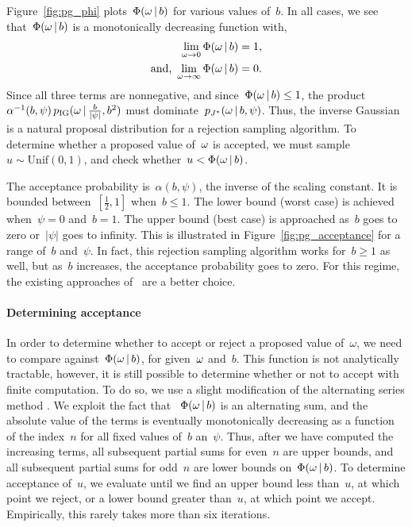 Figure~\ref{fig:pg_phi} plots~$\Phi({\omega} \,|\, b)$ for various values of~$b$.
In all cases, we see that~$\Phi({\omega} \,|\, b)$ is a monotonically
decreasing function with,
\begin{align*}
  \lim_{\omega \to 0} \Phi(\omega \,|\, b) &= 1, \\
  \text{and, }
  \lim_{\omega \to \infty} \Phi(\omega \,|\, b) &= 0.
\end{align*}
Since all three terms are nonnegative, and since~${\Phi({\omega} \,|\,
  b) \leq 1}$, the product~${\alpha^{-1}(b,\psi)\,
  p_{\mathrm{IG}}({\omega} \,|\, \tfrac{b}{|\psi|}, b^2)}$
must dominate~$p_{J^{*}}({\omega} \,|\, b,\psi)$.  Thus, the inverse
Gaussian is a natural proposal distribution for a rejection sampling
algorithm.  To determine whether a proposed value of~${\omega}$ is
accepted, we must sample~${u \sim \mathrm{Unif}(0,1)}$, and check
whether~$u < \Phi({\omega} \,|\, b)$.

The acceptance probability is~$\alpha(b,\psi)$, the inverse of the
scaling constant. It is bounded between~$[\tfrac{1}{2}, 1]$ when~${b
  \leq 1}$.  The lower bound (worst case) is achieved when~${\psi=0}$
and~${b=1}$.  The upper bound (best case) is approached as~$b$ goes to
zero or~$|\psi|$ goes to infinity.  This is illustrated in
Figure~\ref{fig:pg_acceptance} for a range of~$b$ and~$\psi$.
In fact, this rejection sampling algorithm works for~$b \geq 1$ as well,
but as~$b$ increases, the acceptance probability goes to zero. For
this regime, the existing approaches of~\citet{windle2014sampling} are
a better choice.

\paragraph{Determining acceptance}
In order to determine whether to accept or reject a proposed value
of~$\omega$, we need to compare against~${\Phi({\omega} \,|\, b)}$, for
given~${\omega}$ and~$b$. This function is not analytically tractable,
however, it is still possible to determine whether or not to accept
with finite computation. To do so, we use a slight modification of the
alternating series method \citep{devroye1986}.  We exploit the
fact that ~$\Phi({\omega} \,|\, b)$ is an alternating sum, and the
absolute value of the terms is eventually monotonically decreasing as
a function of the index~$n$ for all fixed values of~$b$ an~$\psi$.
Thus, after we have computed the increasing terms, all subsequent
partial sums for even~$n$ are upper bounds, and all subsequent partial
sums for odd~$n$ are lower bounds on~$\Phi({\omega}\,|\, b)$.  To
determine acceptance of~$u$, we evaluate until we find an upper bound
less than~$u$, at which point we reject, or a lower bound greater
than~$u$, at which point we accept. Empirically, this rarely takes
more than six iterations.

